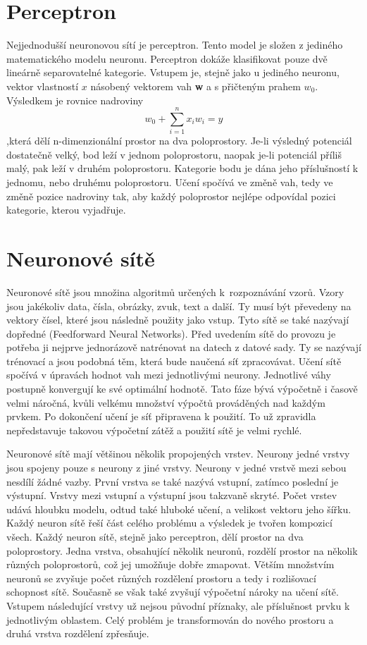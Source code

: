 \section{Perceptron}
Nejjednodušší neuronovou sítí je perceptron.
Tento model je složen z jediného matematického modelu neuronu.
Perceptron dokáže klasifikovat pouze dvě lineárně separovatelné kategorie.
Vstupem je, stejně jako u jediného neuronu, vektor vlastností $x$
násobený vektorem vah \textbf{w} a s přičteným prahem $ w_0 $.
Výsledkem je rovnice nadroviny
\begin{equation}
    w_0 + \sum_{i=1}^{n} x_{i}w_{i} = y
\end{equation}
,která dělí n-dimenzionální prostor na dva poloprostory.
Je-li výsledný potenciál dostatečně velký, bod leží v jednom poloprostoru,
naopak je-li potenciál příliš malý, pak leží v druhém poloprostoru.
Kategorie bodu je dána jeho příslušností k jednomu, nebo druhému poloprostoru.
Učení spočívá ve změně vah, tedy ve změně pozice nadroviny tak,
aby každý poloprostor nejlépe odpovídal pozici kategorie, 
kterou vyjadřuje. 

\section{Neuronové sítě}
Neuronové sítě jsou množina algoritmů určených k~rozpoznávání vzorů.
Vzory jsou jakékoliv data, čísla, obrázky, zvuk, text a další.
Ty musí být převedeny na vektory čísel, 
které jsou následně použity jako vstup.
Tyto sítě se také nazývají dopředné (Feedforward Neural Networks).
Před uvedením sítě do provozu je potřeba 
ji nejprve jednorázově natrénovat na datech z datové sady.
Ty se nazývají trénovací a jsou podobná těm, 
která bude naučená síť zpracovávat.
Učení sítě spočívá v úpravách hodnot vah mezi jednotlivými neurony.
Jednotlivé váhy postupně konvergují ke své optimální hodnotě.
Tato fáze bývá výpočetně i časově velmi náročná,
kvůli velkému množství výpočtů prováděných nad každým prvkem. 
Po dokončení učení je síť připravena k použití.
To už zpravidla nepředstavuje takovou výpočetní zátěž
a použití sítě je velmi rychlé.
\par

Neuronové sítě mají většinou několik propojených vrstev.
Neurony jedné vrstvy jsou spojeny pouze s neurony z jiné vrstvy.
Neurony v jedné vrstvě mezi sebou nesdílí žádné vazby.
První vrstva se také nazývá vstupní, 
zatímco poslední je výstupní.
Vrstvy mezi vstupní a výstupní jsou takzvaně skryté.
Počet vrstev udává hloubku modelu, odtud také hluboké učení, 
a velikost vektoru jeho šířku.
Každý neuron sítě řeší část celého problému 
a výsledek je tvořen kompozicí všech.
Každý neuron sítě, stejně jako perceptron, 
dělí prostor na dva poloprostory.
Jedna vrstva, obsahující několik neuronů, 
rozdělí prostor na několik různých poloprostorů,
což jej umožňuje dobře zmapovat.
Větším množstvím neuronů se zvyšuje počet různých rozdělení prostoru
a tedy i rozlišovací schopnost sítě.
Současně se však také zvyšují výpočetní nároky na učení sítě.
Vstupem následující vrstvy už nejsou původní příznaky,
ale příslušnost prvku k jednotlivým oblastem.
Celý problém je transformován do nového prostoru 
a druhá vrstva rozdělení zpřesňuje.

